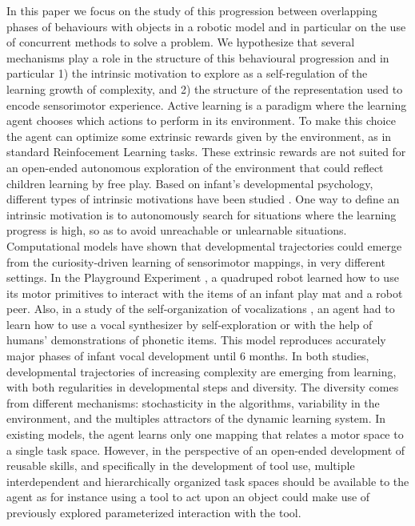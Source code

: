 \documentclass[10pt,letterpaper]{article}
\begin{document}
	In this paper we focus on the study of this progression between overlapping phases of behaviours with objects in a robotic model and in particular on the use of concurrent methods to solve a problem.	
	We hypothesize that several mechanisms play a role in the structure of this behavioural progression and in particular 
	1) the intrinsic motivation to explore as a self-regulation of the learning growth of complexity, and 
	2) the structure of the representation used to encode sensorimotor experience.	
	Active learning is a paradigm where the learning agent chooses which actions to perform in its environment.
	To make this choice the agent can optimize some extrinsic rewards given by the environment, as in standard Reinfocement Learning tasks.
	These extrinsic rewards are not suited for an open-ended autonomous exploration of the environment that could reflect children learning by free play.
	Based on infant's developmental psychology, different types of intrinsic motivations have been studied \cite{santucci2013}.
	One way to define an intrinsic motivation is to autonomously search for situations where the learning progress is high, so as to avoid unreachable or unlearnable situations.
	Computational models have shown that developmental trajectories could emerge from the curiosity-driven learning of sensorimotor mappings, in very different settings.
	In the Playground Experiment \cite{oudeyer_what_2007}, a quadruped robot learned how to use its motor primitives to interact with the items of an infant play mat and a robot peer.
	Also, in a study of the self-organization of vocalizations \cite{moulin-frier_self-organization_2014}, an agent had to learn how to
	use a vocal synthesizer by self-exploration or with the help of humans' demonstrations of phonetic items. 
	This model reproduces accurately major phases of infant vocal development until $6$ months.
	In both studies, developmental trajectories of increasing complexity are emerging from learning, with both regularities in developmental steps and diversity.
	The diversity comes from different mechanisms: stochasticity in the algorithms, variability in the environment, and the multiples attractors of the dynamic learning system.
	In existing models, the agent learns only one mapping that relates a motor space to a single task space. 
	However, in the perspective of an open-ended development of reusable skills, and specifically in the development of tool use, multiple interdependent and hierarchically organized task spaces should be available to the agent
	as for instance using a tool to act upon an object could make use of previously explored parameterized interaction with the tool.
	
\end{document}
